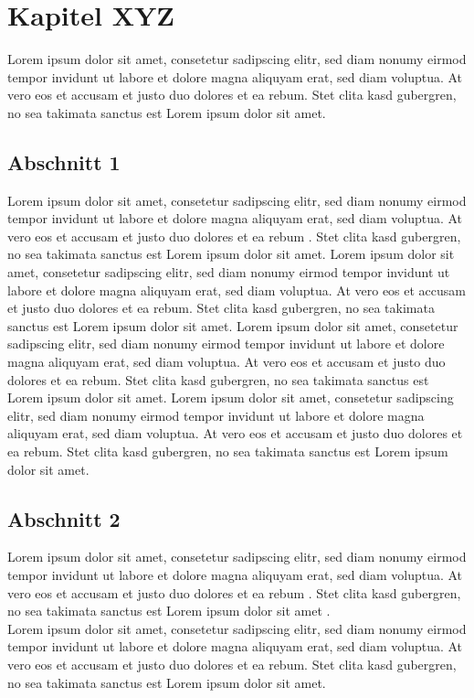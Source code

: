 

\chapter{Kapitel XYZ}
\label{ch:XYZ}

Lorem ipsum dolor sit amet, consetetur sadipscing elitr, sed diam nonumy eirmod
tempor invidunt ut labore et dolore magna aliquyam erat, sed diam voluptua. At
vero eos et accusam et justo duo dolores et ea rebum. Stet clita kasd gubergren,
no sea takimata sanctus est Lorem ipsum dolor sit amet.

\section{Abschnitt 1}
\label{ch:XYZ:sec:Abschnitt1}

Lorem ipsum dolor sit amet, consetetur sadipscing elitr, sed diam nonumy eirmod
tempor invidunt ut labore et dolore magna aliquyam erat, sed diam voluptua. At
vero eos et accusam et justo duo dolores et ea rebum \cite{beethoven}. Stet
clita kasd gubergren, no sea takimata sanctus est Lorem ipsum dolor sit amet.
Lorem ipsum dolor sit amet, consetetur sadipscing elitr, sed diam nonumy eirmod
tempor invidunt ut labore \cite{sloman} et dolore magna aliquyam erat, sed diam
voluptua. At vero eos et accusam et justo duo dolores \cite{stenz85:_about_time}
et ea rebum. Stet clita kasd gubergren, no sea takimata sanctus est Lorem ipsum
dolor sit amet.
Lorem ipsum dolor sit amet, consetetur sadipscing elitr, sed diam nonumy eirmod
tempor invidunt ut labore et dolore magna aliquyam erat, sed diam voluptua. At
vero eos et accusam et justo duo dolores et ea rebum. Stet clita kasd gubergren,
no sea takimata sanctus est Lorem ipsum dolor sit amet.
Lorem ipsum dolor sit amet, consetetur sadipscing elitr, sed diam nonumy eirmod
tempor invidunt ut labore et dolore magna aliquyam erat, sed diam voluptua. At
vero eos et accusam et justo duo dolores et ea rebum. Stet clita kasd gubergren,
no sea takimata sanctus est Lorem ipsum dolor sit amet.

\section{Abschnitt 2}
\label{ch:XYZ:sec:Abschnitt2}

Lorem ipsum dolor sit amet, consetetur sadipscing elitr, sed diam nonumy eirmod
tempor invidunt ut labore et dolore magna aliquyam erat, sed diam voluptua. At
vero eos et accusam et justo duo dolores et ea rebum \cite{buch1}. Stet clita
kasd gubergren, no sea takimata sanctus est Lorem ipsum dolor sit amet
\cite{JSAC96}.\\
Lorem ipsum dolor sit amet, consetetur sadipscing elitr, sed diam nonumy eirmod
tempor invidunt ut labore et dolore magna \cite{TB2000} aliquyam erat, sed diam
voluptua.
At vero eos et accusam et justo duo dolores et ea rebum. Stet clita kasd
gubergren, no sea takimata sanctus est Lorem ipsum dolor sit amet.

